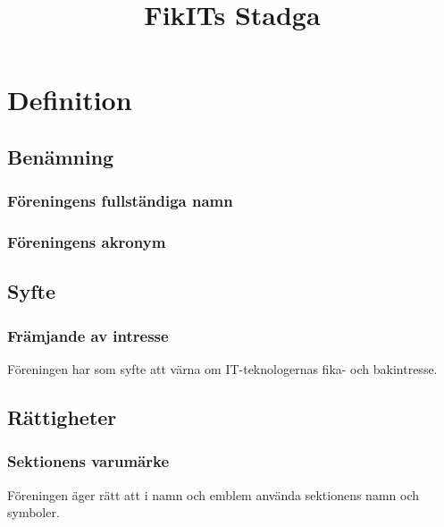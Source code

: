 \documentclass[11pt, noincludeaddress]{classes/cthit}
\begin{document}
\title{FikITs Stadga}

\maketitle

\thispagestyle{empty}

\newpage

\makeheadfoot%

\setcounter{tocdepth}{2}
\setcounter{page}{1}
\tableofcontents

\newpage

\section{Definition}




\subsection{Benämning}

\subsubsection{Föreningens fullständiga namn}
\FIKITFULL{} 

\subsubsection{Föreningens akronym}
\FIKIT{}




\subsection{Syfte}

\subsubsection{Främjande av intresse}
Föreningen har som syfte att värna om IT-teknologernas fika- och bakintresse.

\subsection{Rättigheter}
\subsubsection{Sektionens varumärke}
Föreningen äger rätt att i namn och emblem använda sektionens namn och symboler. 
\end{document}
